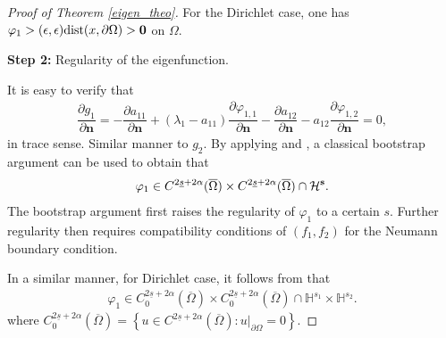 \documentclass[a4paper,11pt]{amsart}
\theoremstyle{definition}
\newcommand{\opname}[1]{\mbox{\rm #1}\,}
\newcommand{\dist}{\opname{dist}}
\def\O{\Omega}
\def\dist{\text{\rm dist}}
\numberwithin{equation}{section}
\theoremstyle{definition}
\def\O{\Omega}
\def\dist{\text{\rm dist}}
\begin{document}
\begin{proof}[Proof of Theorem \ref{eigen_theo}]
For the Dirichlet case, one has $\varphi_{1}>(\epsilon,\epsilon)\dist(x,\partial \O)>\textbf{0}$ on $\O$.


{\bf Step 2:} Regularity of the eigenfunction.

It is easy to verify that
\begin{align*}
\dfrac{\partial g_1}{\partial\textbf{n}}=-\dfrac{\partial a_{11}}{\partial\textbf{n}}+(\lambda_1-a_{11})\dfrac{\partial\varphi_{1,1}}{\partial\textbf{n}}-\dfrac{\partial a_{12}}{\partial\textbf{n}}-a_{12}\dfrac{\partial \varphi_{1,2}}{\partial\textbf{n}} =0,
\end{align*}
in trace sense. Similar manner to $g_2$.  By applying \cite[Theorem 4.1]{grubb_regularity_2016} and \cite[Corollary 2.2]{zhao_spatiotemporal_2025}, a classical bootstrap argument can be used to obtain that
\begin{align*}
\varphi_{1}\in C^{2\underline{s}+2\alpha}(\overline{\O})\times C^{2\underline{s}+2\alpha}(\overline{\O})\cap \mathcal{H}^{\bf s}.
\end{align*}
 The bootstrap argument first raises the regularity of $\varphi_1$ to a certain $s$. Further regularity then requires compatibility conditions of $(f_1,f_2)$ for the Neumann boundary condition.
 


In a similar manner, for Dirichlet case, it follows from \cite[Corollary 2.3]{zhao_spatiotemporal_2025} that
\begin{align*}
\varphi_{1}\in C_0^{2\underline{s}+2\alpha}(\overline{\O})\times C_0^{2\underline{s}+2\alpha}(\overline{\O})\cap \mathbb{H}^{s_1}\times \mathbb{H}^{s_2} .
\end{align*}
where $C_0^{2\underline{s}+2\alpha}(\overline{\O})=\left\{ u\in C^{2\underline{s}+2\alpha}(\overline{\O}): u|_{\partial \O}=0\right\}$.
 
 





\end{proof}
\end{document}
